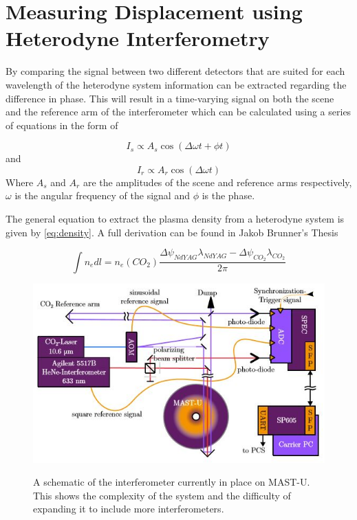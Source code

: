 \documentclass[12pt,a4paper,oneside]{report}
\begin{document}
	\section{Measuring Displacement using Heterodyne Interferometry}
By comparing the signal between two different detectors that are suited for each wavelength of the heterodyne system information can be extracted regarding the difference in phase. This will result in a time-varying signal on both the scene and the reference arm of the interferometer which can be calculated using a series of equations in the form of \cite{WuHeterodyneNanometrology}

\begin{equation}
	I{_{s}} \propto A{_{s}}\cos{(\Delta\omega t + \phi{t})}
    \label{SceneInt}
\end{equation}
and
\begin{equation}
	I{_{r}} \propto A{_{r}}\cos{(\Delta\omega t)}
    \label{RefInt}
\end{equation}
Where $A{_{s}}$ and $A{_{r}}$ are the amplitudes of the scene and reference arms respectively, $\omega$ is the angular frequency of the signal and $\phi$ is the phase.


    
    
The general equation to extract the plasma density from a heterodyne system \cite{Esteban2010ContinuousFPGAs} is given by \autoref{eq:density}. A full derivation can be found in Jakob Brunner's Thesis \cite[p. 22-29]{Brunner2017}

\begin{equation}
	\int{n_{e}dl} = n_{e}(CO_{2})\frac{\Delta\psi_{NdYAG}\lambda_{NdYAG}-\Delta\psi_{CO_{2}}\lambda_{CO_{2}}}{2\pi}
    \label{eq:density}
\end{equation}
\begin{figure}[H]
\includegraphics[width=\textwidth, center,angle=0]{Images/mastuint.JPG}
\label{MAST-U Int}
\caption{A schematic of the interferometer currently in place on MAST-U. This shows the complexity of the system and the difficulty of expanding it to include more interferometers. \cite{Brunner2017}}
\end{figure}
\end{document}

